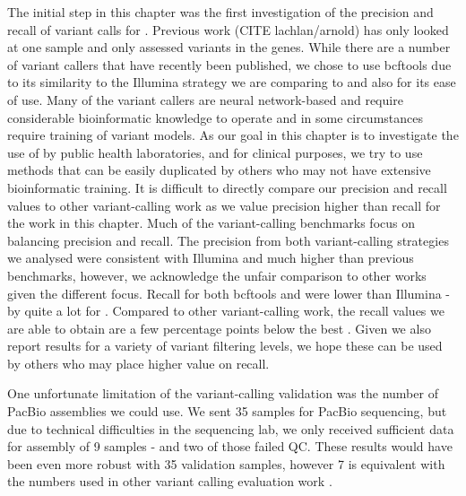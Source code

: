 The initial step in this chapter was the first investigation of the precision and recall of \ont{} variant calls for \mtb{}. Previous work (CITE lachlan/arnold) has only looked at one sample and only assessed variants in the \ppe{} genes. While there are a number of \ont{} variant callers that have recently been published, we chose to use bcftools due to its similarity to the Illumina strategy we are comparing to and also for its ease of use. Many of the \ont{} variant callers are neural network-based and require considerable bioinformatic knowledge to operate and in some circumstances require training of variant models. As our goal in this chapter is to investigate the use of \ont{} by public health laboratories, and for clinical purposes, we try to use methods that can be easily duplicated by others who may not have extensive bioinformatic training. It is difficult to directly compare our precision and recall values to other \ont{} variant-calling work as we value precision higher than recall for the work in this chapter. Much of the \ont{} variant-calling benchmarks focus on balancing precision and recall. The precision from both \ont{} variant-calling strategies we analysed were consistent with Illumina and much higher than previous \ont{} benchmarks, however, we acknowledge the unfair comparison to other works given the different focus. Recall for both bcftools and \pandora{} were lower than Illumina - by quite a lot for \pandora{}. Compared to other \ont{} variant-calling work, the recall values we are able to obtain are a few percentage points below the best \cite{sanderson2020}. Given we also report results for a variety of variant filtering levels, we hope these can be used by others who may place higher value on recall.

One unfortunate limitation of the variant-calling validation was the number of PacBio assemblies we could use. We sent 35 samples for PacBio sequencing, but due to technical difficulties in the sequencing lab, we only received sufficient data for assembly of 9 samples - and two of those failed QC. These results would have been even more robust with 35 validation samples, however 7 is equivalent with the numbers used in other \ont{} variant calling evaluation work \cite{sanderson2020,clair2020,clairvoyant2019}.

